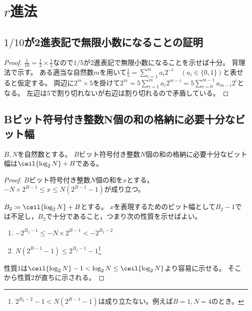 \chapter{\texorpdfstring{$r$}{r}進法}
    \section{\texorpdfstring{$1/10$}{1/10}が2進表記で無限小数になることの証明}
        \begin{proof}
            $\frac{1}{10}=\frac{1}{2}\times\frac{1}{5}$なので$1/5$が2進表記で無限小数になることを示せば十分。
            背理法で示す。
            ある適当な自然数$m$を用いて$\frac{1}{5} = \sum_{i=1}^m a_i 2^{-i} \quad (a_i\in\{0,1\})$と表せると仮定する。
            両辺に$2^m\times 5$を掛けて$2^m = 5\sum_{i=1}^m a_i 2^{m-i} = 5\sum_{i=0}^{m-1}a_{m-i}2^i$となる。
            左辺は5で割り切れないが右辺は割り切れるので矛盾している。
        \end{proof}
    \section{Bビット符号付き整数N個の和の格納に必要十分なビット幅}
        \begin{shadebox}
            $B,N$を自然数とする。
            $B$ビット符号付き整数$N$個の和の格納に必要十分なビット幅は$\ceil{\log_2 N} + B$である。
        \end{shadebox}
        \begin{proof}
            $B$ビット符号付き整数$N$個の和を$x$とする。
            $-N\times 2^{B-1}\leq x\leq N(2^{B-1}-1)$が成り立つ。
            \par
            $B_2\coloneq\ceil{\log_2 N} + B$とする。
            $x$を表現するためのビット幅として$B_2-1$では不足し，$B_2$で十分であること，つまり次の性質を示せばよい。
            \begin{enumerate}
                \item $-2^{B_2-1} \leq -N\times 2^{B-1} < -2^{B_2-2}$
                \item $N(2^{B-1}-1) \leq 2^{B_2-1}-1$\footnote{$2^{B_2-2}-1 < N(2^{B-1}-1)$は成り立たない。例えば$B=1,N=4$のとき。}
            \end{enumerate}
            性質1は$\ceil{\log_2 N}-1<\log_2 N \leq\ceil{\log_2 N}$より容易に示せる。
            そこから性質2が直ちに示される。
        \end{proof}